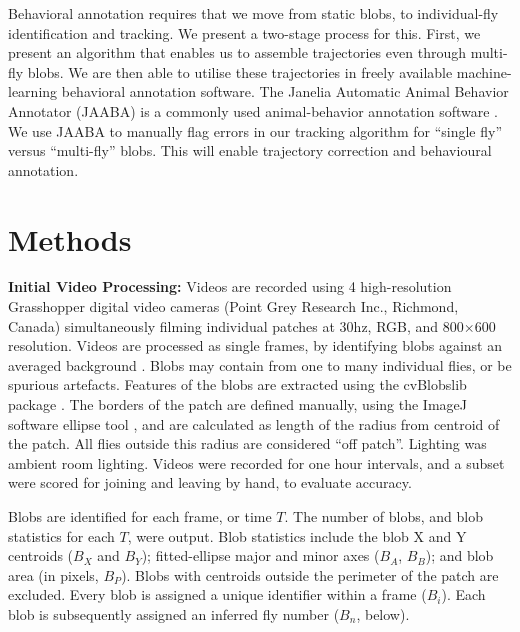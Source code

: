 \documentclass[11pt]{article}
\begin{document}
{Behavioral annotation requires that we move from static blobs, to individual-fly identification and tracking. We present a two-stage  process for this. First, we present an algorithm that enables us to assemble trajectories even through multi-fly blobs. We are then able to utilise these trajectories in freely available machine-learning behavioral annotation software. The Janelia Automatic Animal Behavior Annotator (JAABA) is a commonly used animal-behavior annotation software \cite{jaaba}. We use JAABA to manually flag errors in our tracking algorithm for ``single fly'' versus ``multi-fly'' blobs. This will enable trajectory correction and behavioural annotation.

\vspace*{-0.15in}

\section*{Methods}\label{s:methods}
\vspace*{-0.15in}
{\bf Initial Video Processing:}
Videos are recorded using 4 high-resolution Grasshopper digital video cameras (Point Grey Research Inc., Richmond, Canada)  simultaneously filming individual patches at 30hz, RGB, and 800$\times$600 resolution. Videos are processed as single frames, by identifying blobs against an averaged background \cite{ArdekaniTavare:2013}. Blobs may contain from one to many individual flies, or be spurious artefacts. Features of the blobs are extracted using the cvBlobslib package  \cite{opencv}. The borders of the patch are defined manually, using the ImageJ software ellipse tool \cite{imagej}, and are calculated as length of the radius from centroid of the patch. All flies outside this radius are considered ``off patch''. Lighting was ambient room lighting. Videos were recorded for one hour intervals, and a subset were scored for joining and leaving by hand, to evaluate accuracy. 

Blobs are identified for each frame, or time $T$. The number of blobs, and blob statistics for each $T$, were output. Blob statistics include the blob X and Y centroids ($B_X$ and $B_Y$); fitted-ellipse major and minor axes ($B_A$, $B_B$); and blob area (in pixels, $B_P$). Blobs with centroids outside the perimeter of the patch are excluded. Every blob is assigned a unique identifier within a frame ($B_i$). Each blob is subsequently assigned an inferred fly number ($B_n$, below).

}
\end{document}
